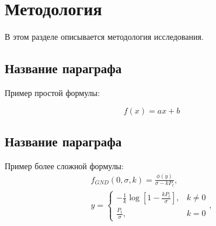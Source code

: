 \section{Методология}
\label{sec:Method}

В этом разделе описывается методология исследования.

\subsection{Название параграфа}
\label{sec:}

Пример простой формулы:

\begin{equation}\label{eq:eq_descr_1}
f(x) = ax+b
\end{equation}

\subsection{Название параграфа}
\label{sec:}

Пример более сложной формулы:
\begin{eqnarray}\label{eq:eq_descr_2}
f_{GND}(0, \sigma, k) = \frac{\phi(y)}{\sigma - k P_t},\\
y = \left\{
\begin{array}{ll}
 -\frac{1}{k} \log \left[  1 - \frac{k P_t}{\sigma} \right], & k \neq 0 \\
  \frac{P_t}{\sigma}, & k = 0
\end{array}
\right.\nonumber,
\end{eqnarray}